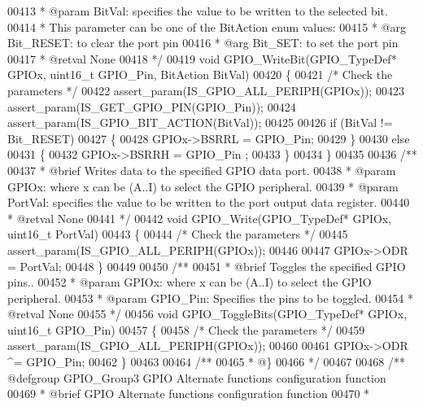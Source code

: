 \begin{DoxyCode}
00413 \textcolor{comment}{  * @param  BitVal: specifies the value to be written to the selected bit.}
00414 \textcolor{comment}{  *          This parameter can be one of the BitAction enum values:}
00415 \textcolor{comment}{  *            @arg Bit\_RESET: to clear the port pin}
00416 \textcolor{comment}{  *            @arg Bit\_SET: to set the port pin}
00417 \textcolor{comment}{  * @retval None}
00418 \textcolor{comment}{  */}
00419 \textcolor{keywordtype}{void} GPIO_WriteBit(GPIO\_TypeDef* GPIOx, uint16\_t GPIO\_Pin, BitAction BitVal)
00420 \{
00421   \textcolor{comment}{/* Check the parameters */}
00422   assert_param(IS\_GPIO\_ALL\_PERIPH(GPIOx));
00423   assert_param(IS\_GET\_GPIO\_PIN(GPIO\_Pin));
00424   assert_param(IS\_GPIO\_BIT\_ACTION(BitVal));
00425 
00426   \textcolor{keywordflow}{if} (BitVal != Bit_RESET)
00427   \{
00428     GPIOx->BSRRL = GPIO\_Pin;
00429   \}
00430   \textcolor{keywordflow}{else}
00431   \{
00432     GPIOx->BSRRH = GPIO\_Pin ;
00433   \}
00434 \}
00435 
00436 \textcolor{comment}{/**}
00437 \textcolor{comment}{  * @brief  Writes data to the specified GPIO data port.}
00438 \textcolor{comment}{  * @param  GPIOx: where x can be (A..I) to select the GPIO peripheral.}
00439 \textcolor{comment}{  * @param  PortVal: specifies the value to be written to the port output data register.}
00440 \textcolor{comment}{  * @retval None}
00441 \textcolor{comment}{  */}
00442 \textcolor{keywordtype}{void} GPIO_Write(GPIO\_TypeDef* GPIOx, uint16\_t PortVal)
00443 \{
00444   \textcolor{comment}{/* Check the parameters */}
00445   assert_param(IS\_GPIO\_ALL\_PERIPH(GPIOx));
00446 
00447   GPIOx->ODR = PortVal;
00448 \}
00449 
00450 \textcolor{comment}{/**}
00451 \textcolor{comment}{  * @brief  Toggles the specified GPIO pins..}
00452 \textcolor{comment}{  * @param  GPIOx: where x can be (A..I) to select the GPIO peripheral.}
00453 \textcolor{comment}{  * @param  GPIO\_Pin: Specifies the pins to be toggled.}
00454 \textcolor{comment}{  * @retval None}
00455 \textcolor{comment}{  */}
00456 \textcolor{keywordtype}{void} GPIO_ToggleBits(GPIO\_TypeDef* GPIOx, uint16\_t GPIO\_Pin)
00457 \{
00458   \textcolor{comment}{/* Check the parameters */}
00459   assert_param(IS\_GPIO\_ALL\_PERIPH(GPIOx));
00460 
00461   GPIOx->ODR ^= GPIO\_Pin;
00462 \}
00463 
00464 \textcolor{comment}{/**}
00465 \textcolor{comment}{  * @\}}
00466 \textcolor{comment}{  */}
00467 
00468 \textcolor{comment}{/** @defgroup GPIO\_Group3 GPIO Alternate functions configuration function}
00469 \textcolor{comment}{ *  @brief   GPIO Alternate functions configuration function}
00470 \textcolor{comment}{ *}

\end{DoxyCode}
